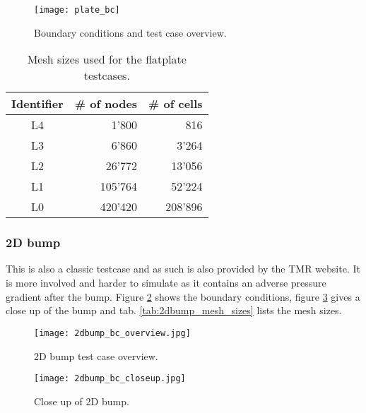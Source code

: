 \begin{figure}[H] \centering
    \texttt{[image: plate\_bc]}
    \caption{Boundary conditions and test case overview. \cite{nasatmr}}
    \label{fig:plate_bc}
\end{figure}

\begin{table}[H]
    \centering
    \begin{tabular}{c r r}
        Identifier      & \# of nodes   & \# of cells \\
        \toprule
        L4              & 1'800         & 816 \\
        L3              & 6'860         & 3'264 \\
        L2              & 26'772        & 13'056 \\
        L1              & 105'764       & 52'224 \\
        L0              & 420'420       & 208'896 \\

    \end{tabular}
    \caption{Mesh sizes used for the flatplate testcases.}
    \label{tab:plate_mesh_sizes}
\end{table}


\subsubsection{2D bump}
This is also a classic testcase and as such is also provided by the TMR
website. It is more involved and harder to simulate as it contains an adverse
pressure gradient after the bump. Figure \ref{fig:2dbump_bc} shows the boundary
conditions, figure \ref{fig:2dbump_closeup} gives a close up of the bump and
tab. \ref{tab:2dbump_mesh_sizes} lists the mesh sizes.

\begin{figure}[H] \centering
    \texttt{[image: 2dbump\_bc\_overview.jpg]}
    \caption{2D bump test case overview. \cite{nasatmr}}
    \label{fig:2dbump_bc}
\end{figure}

\begin{figure}[H] \centering
    \texttt{[image: 2dbump\_bc\_closeup.jpg]}
    \caption{Close up of 2D bump. \cite{nasatmr}}
    \label{fig:2dbump_closeup}
\end{figure}


